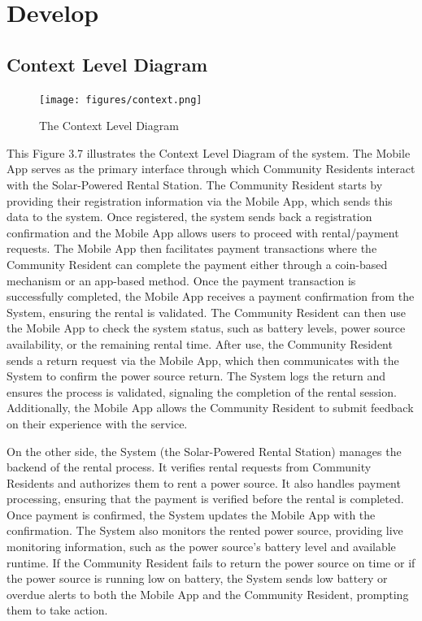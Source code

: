 {\section{Develop}

\subsection{Context Level Diagram}

\begin{figure}[H]
	\centering
	\caption{The Context Level Diagram}
	\label{fig:context level diagram}
	\texttt{[image: figures/context.png]}
\end{figure}

This Figure 3.7 illustrates the Context Level Diagram of the system. The Mobile App serves as the primary interface through which Community Residents interact with the Solar-Powered Rental Station. The Community Resident starts by providing their registration information via the Mobile App, which sends this data to the system. Once registered, the system sends back a registration confirmation and the Mobile App allows users to proceed with rental/payment requests. The Mobile App then facilitates payment transactions where the Community Resident can complete the payment either through a coin-based mechanism or an app-based method. Once the payment transaction is successfully completed, the Mobile App receives a payment confirmation from the System, ensuring the rental is validated. The Community Resident can then use the Mobile App to check the system status, such as battery levels, power source availability, or the remaining rental time. After use, the Community Resident sends a return request via the Mobile App, which then communicates with the System to confirm the power source return. The System logs the return and ensures the process is validated, signaling the completion of the rental session. Additionally, the Mobile App allows the Community Resident to submit feedback on their experience with the service.

On the other side, the System (the Solar-Powered Rental Station) manages the backend of the rental process. It verifies rental requests from Community Residents and authorizes them to rent a power source. It also handles payment processing, ensuring that the payment is verified before the rental is completed. Once payment is confirmed, the System updates the Mobile App with the confirmation. The System also monitors the rented power source, providing live monitoring information, such as the power source’s battery level and available runtime. If the Community Resident fails to return the power source on time or if the power source is running low on battery, the System sends low battery or overdue alerts to both the Mobile App and the Community Resident, prompting them to take action. 

}
